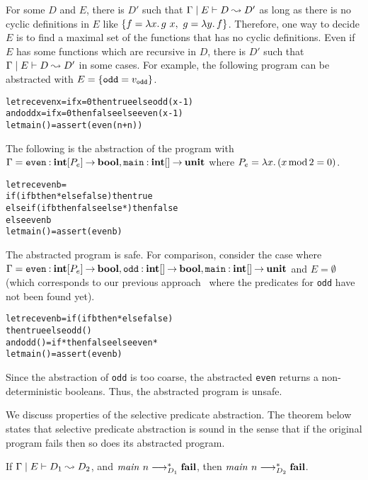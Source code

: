 For some $D$ and $E$, there is $D'$ such that
${\Gamma} \mid {E} \vdash {D} \leadsto {D'}$ as long as there is no cyclic definitions
in $E$ like $\{{f = \lambda{x}.\,{{g}~{x}},~ g = \lambda{y}.\,{f}}\}$.
Therefore, one way to decide $E$ is to find a maximal set of the
functions that has no cyclic definitions.
Even if $E$ has some functions which are recursive in $D$,
there is $D'$ such that ${\Gamma} \mid {E} \vdash {D} \leadsto {D'}$ in some cases.
For example, the following program can be abstracted with $E = \{{\mathtt{odd} = v_\mathtt{odd}}\}$.
\vspace{-5pt}
\begin{alltt}
 letrec even x = if x = 0 then true else odd (x-1)
     and odd x = if x = 0 then false else even (x-1)
 let main () = assert (even (n+n))
\end{alltt}
\vspace{-5pt}
The following is the abstraction of the program with $\Gamma =
\mathtt{even}\mathbin{:}{\mathbf{int}[P_e]}\mathbin{\rightarrow}{\mathbf{bool}},
\mathtt{main}\mathbin{:}{\mathbf{int}[]}\mathbin{\rightarrow}{\mathbf{unit}}$ where $P_e = \lambda{x}.\,{(x
\mathop{\mathrm{mod}} 2 = 0})$.
\vspace{-5pt}
\begin{alltt}
 letrec even b =
   if (if b then * else false) then true
   else if (if b then false else *) then false
   else even b
 let main () = assert (even b)
\end{alltt}
\vspace{-5pt}
The abstracted program is safe.  For comparison, consider
the case where $\Gamma = \mathtt{even}\mathbin{:}{\mathbf{int}[P_e]}\mathbin{\rightarrow}{\mathbf{bool}},
\mathtt{odd}\mathbin{:}{\mathbf{int}[]}\mathbin{\rightarrow}{\mathbf{bool}},
\mathtt{main}\mathbin{:}{\mathbf{int}[]}\mathbin{\rightarrow}{\mathbf{unit}}$ and $E=\emptyset$ (which
corresponds to our previous approach~\cite{KobayashiPLDI2011} where the predicates for
\texttt{odd} have not been found yet).
\vspace{-5pt}
\begin{alltt}
 letrec even b = if (if b then * else false)
                 then true else odd ()
    and odd () = if * then false else even *
 let main () = assert (even b)
\end{alltt}
\vspace{-5pt}
Since the abstraction of \texttt{odd} is too coarse, the abstracted
\texttt{even} returns a non-deterministic booleans.  Thus, the
abstracted program is unsafe.

We discuss properties of the selective predicate abstraction.
The theorem below states that selective predicate abstraction is sound
in the sense that if the original program fails then so does its
abstracted program.
\begin{theorem}
\label{thm:abst_sound}
 If ${\Gamma} \mid {E} \vdash {D_1} \leadsto {D_2}$, and
 ${\mathit{main}}~{n} \longrightarrow_{D_1}^* \mathbf{fail}$, then
 ${\mathit{main}}~{n} \longrightarrow_{D_2}^* \mathbf{fail}$.
\end{theorem}

